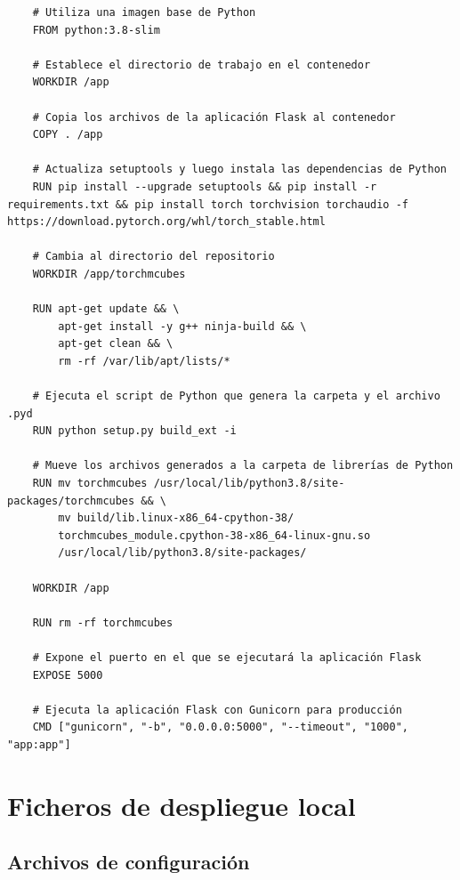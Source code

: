 \captionsetup{type=listing}
\label{lst:dockerfileM3D}
\begin{verbatim}
    # Utiliza una imagen base de Python
    FROM python:3.8-slim
    
    # Establece el directorio de trabajo en el contenedor
    WORKDIR /app
    
    # Copia los archivos de la aplicación Flask al contenedor
    COPY . /app
    
    # Actualiza setuptools y luego instala las dependencias de Python
    RUN pip install --upgrade setuptools && pip install -r requirements.txt && pip install torch torchvision torchaudio -f https://download.pytorch.org/whl/torch_stable.html
    
    # Cambia al directorio del repositorio
    WORKDIR /app/torchmcubes
    
    RUN apt-get update && \
        apt-get install -y g++ ninja-build && \
        apt-get clean && \
        rm -rf /var/lib/apt/lists/*
    
    # Ejecuta el script de Python que genera la carpeta y el archivo .pyd
    RUN python setup.py build_ext -i
    
    # Mueve los archivos generados a la carpeta de librerías de Python
    RUN mv torchmcubes /usr/local/lib/python3.8/site-packages/torchmcubes && \
        mv build/lib.linux-x86_64-cpython-38/
        torchmcubes_module.cpython-38-x86_64-linux-gnu.so 
        /usr/local/lib/python3.8/site-packages/
    
    WORKDIR /app
    
    RUN rm -rf torchmcubes
    
    # Expone el puerto en el que se ejecutará la aplicación Flask
    EXPOSE 5000
    
    # Ejecuta la aplicación Flask con Gunicorn para producción
    CMD ["gunicorn", "-b", "0.0.0.0:5000", "--timeout", "1000", "app:app"]
\end{verbatim}



\chapter{Ficheros de despliegue local}
\section{Archivos de configuración}
\label{sec:puntoB1}
 
